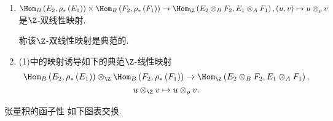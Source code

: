\begin{proposition}{}{}
	\begin{enumerate}
		\item $\Hom_{B}\left(E_{2},\rho_{\ast}\left(E_{1}\right)\right)\times\Hom_{B}\left(F_{2},\rho_{\ast}\left(F_{1}\right)\right)\to\Hom_{\Z}\left(E_{2}\otimes_{B}F_{2},E_{1}\otimes_{A}F_{1}\right),\left(u,v\right)\mapsto u\otimes_{\rho}v$是$\Z$-双线性映射.
		
		称该$\Z$-双线性映射是典范的.
		\item (1)中的映射诱导如下的典范$\Z$-线性映射
		\begin{gather*}
			\Hom_{B}\left(E_{2},\rho_{\ast}\left(E_{1}\right)\right)\otimes_{\Z}\Hom_{B}\left(F_{2},\rho_{\ast}\left(F_{1}\right)\right)\to\Hom_{\Z}\left(E_{2}\otimes_{B}F_{2},E_{1}\otimes_{A}F_{1}\right),\\
			u\otimes_{\Z}v\mapsto u\otimes_{\rho}v.
		\end{gather*}
	\end{enumerate}
\end{proposition}

\begin{proposition}{张量积的函子性}{}
	如下图表交换.
	\begin{center}
	\end{center}
\end{proposition}
